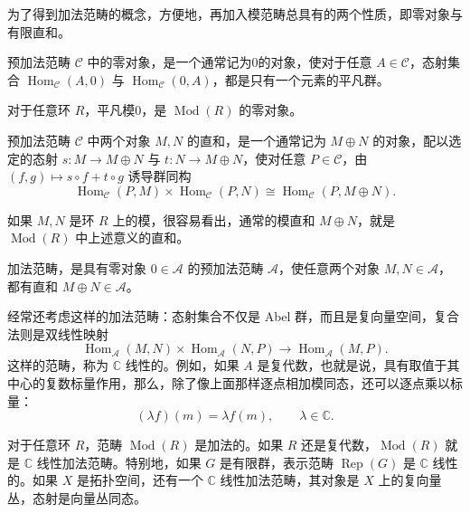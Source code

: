 为了得到加法范畴的概念，方便地，再加入模范畴总具有的两个性质，即零对象与有限直和。

\begin{definition*}\label{def:4.zero-object}
预加法范畴 $\mathcal{C}$ 中的零对象，是一个通常记为0的对象，使对于任意 $A\in\mathcal{C}$，态射集合 $\operatorname{Hom}_{\mathcal{C}}(A,0)$ 与 $\operatorname{Hom}_{\mathcal{C}}(0,A)$，都是只有一个元素的平凡群。
\end{definition*}
对于任意环 $R$，平凡模0，是 $\operatorname{Mod}(R)$ 的零对象。

\begin{definition*}\label{def:4.direct-sum}
预加法范畴 $\mathcal{C}$ 中两个对象 $M,N$ 的直和，是一个通常记为 $M\oplus N$ 的对象，配以选定的态射 $s\colon M\to M\oplus N$ 与 $t\colon N\to M\oplus N$，使对任意 $P\in\mathcal{C}$，由 $(f,g)\mapsto s\circ f+t\circ g$ 诱导群同构
\[
\operatorname{Hom}_{\mathcal{C}}(P,M)\times
\operatorname{Hom}_{\mathcal{C}}(P,N)
\cong\operatorname{Hom}_{\mathcal{C}}(P,M\oplus N).
\]
\end{definition*}
如果 $M,N$ 是环 $R$ 上的模，很容易看出，通常的模直和 $M\oplus N$，就是 $\operatorname{Mod}(R)$ 中上述意义的直和。

\begin{definition}\label{def:4.15}
加法范畴，是具有零对象 $0\in\mathcal{A}$ 的预加法范畴 $\mathcal{A}$，使任意两个对象 $M,N\in\mathcal{A}$，都有直和 $M\oplus N\in\mathcal{A}$。
\end{definition}

经常还考虑这样的加法范畴：态射集合不仅是 Abel 群，而且是复向量空间，复合法则是双线性映射
\[
\operatorname{Hom}_{\mathcal{A}}(M,N)\times
\operatorname{Hom}_{\mathcal{A}}(N,P)
\longrightarrow\operatorname{Hom}_{\mathcal{A}}(M,P).
\]
这样的范畴，称为 $\mathbb{C}$ 线性的。例如，如果 $A$ 是复代数，也就是说，具有取值于其中心的复数标量作用，那么，除了像上面那样逐点相加模同态，还可以逐点乘以标量：
\[
(\lambda f)(m)=\lambda f(m),\qquad\lambda\in\mathbb{C}.
\]

\begin{example}\label{ex:4.16}
对于任意环 $R$，范畴 $\operatorname{Mod}(R)$ 是加法的。如果 $R$ 还是复代数，$\operatorname{Mod}(R)$ 就是 $\mathbb{C}$ 线性加法范畴。特别地，如果 $G$ 是有限群，表示范畴 $\operatorname{Rep}(G)$ 是 $\mathbb{C}$ 线性的。如果 $X$ 是拓扑空间，还有一个 $\mathbb{C}$ 线性加法范畴，其对象是 $X$ 上的复向量丛，态射是向量丛同态。
\end{example}

